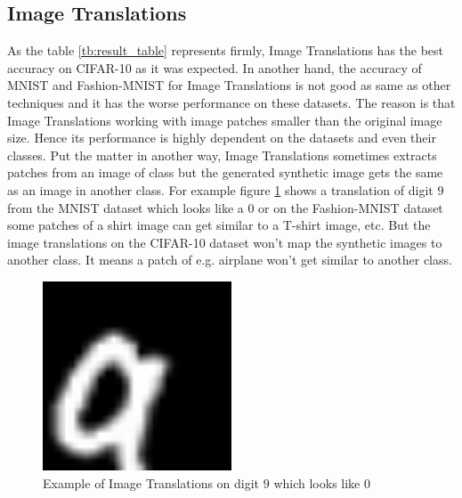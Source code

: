 \subsection{Image Translations}
As the table \ref{tb:result_table} represents firmly, Image Translations has the best accuracy on CIFAR-10 as it
was expected. In another hand, the accuracy of MNIST and Fashion-MNIST for Image Translations is not
good as same as other techniques and it has the worse performance on these datasets. The reason is
that Image Translations working with image patches smaller than the original image size. Hence its
performance is highly dependent on the datasets and even their classes. Put the matter in another
way, Image Translations sometimes extracts patches from an image of class but the generated synthetic
image gets the same as an image in another class. For example figure \ref{fig:image_translation_example_bad_accuracy} shows a translation of
digit $9$ from the MNIST dataset which looks like a $0$ or on the Fashion-MNIST dataset some patches
of a shirt image can get similar to a T-shirt image, etc. But the image translations on the CIFAR-10
dataset won't map the synthetic images to another class. It means a patch of e.g. airplane won't get
similar to another class. 
\begin{figure}
  \centering
  \label{fig:image_translation_example_bad_accuracy}
  \includegraphics[width=0.5\textwidth]{fig/result/Image_translations_mnist}
  \caption{Example of Image Translations on digit $9$ which looks like $0$}
\end{figure}

